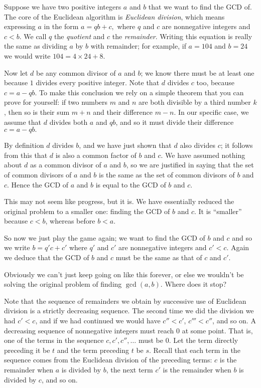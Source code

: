 \documentclass[a4paper,twocolumn]{article}
\begin{document}
Suppose we have two positive integers $a$ and $b$ that we want to find the GCD of.
The core of the Euclidean algorithm is \emph{Euclidean division}, which means expressing $a$
in the form \(a=qb+c,\) where $q$ and $c$ are nonnegative integers and $c<b$. We call $q$
the \emph{quotient} and $c$ the \emph{remainder}. Writing
this equation is really the same as dividing $a$ by $b$ with remainder; for example, if $a=104$ and $b=24$
we would write \(104=4\times24+8.\)

Now let $d$ be any common divisor of $a$ and $b$; we know there must be at least one
because $1$ divides every positive integer. Note that $d$ divides $c$ too, because $c=a-qb$.
To make this conclusion we rely on a simple theorem that you can prove for yourself:
if two numbers $m$ and $n$ are both divisible by a third number $k$, then so is their
sum $m+n$ and their difference $m-n$. In our specific case, we assume that $d$ divides both
$a$ and $qb$, and so it must divide their difference $c=a-qb.$

By definition $d$ divides $b$, and we have just shown that $d$ also divides $c$; it follows
from this that $d$ is also a common factor of $b$ and $c$. We have assumed nothing about $d$
as a common divisor of $a$ and $b$, so we are justified in saying that the set of common
divisors of $a$ and $b$ is the same as the set of common divisors of $b$ and $c$. Hence the
GCD of $a$ and $b$ is equal to the GCD of $b$ and $c$.

This may not seem like progress, but it is. We have essentially reduced the original
problem to a smaller one: finding the GCD of $b$ and $c$. It is ``smaller'' because $c<b$,
whereas before $b<a$.

So now we just play the game again; we want to find the GCD of $b$ and $c$ and so we write
\(b=q'c+c'\)
where $q'$ and $c'$ are nonnegative integers and $c'<c$. Again we deduce that the GCD of $b$
and $c$ must be the same as that of $c$ and $c'$.

Obviously  we can't just keep going on like this forever, or else we wouldn't be solving
the original problem of finding $\gcd(a,b)$. Where does it stop?

Note that the sequence of remainders we obtain by successive use of Euclidean division is a strictly decreasing sequence.
The second time we did the division we had $c'<c$, and if we had continued we would have $c''<c'$, $c'''<c''$, and so on.
A decreasing sequence of nonnegative integers must reach $0$ at some point. That is, one of the terms in the sequence
$c,c',c'',\ldots$ must be $0$. Let the term directly preceding it be $t$ and the term preceding $t$ be $s$. Recall
that each term in the sequence comes from the Euclidean division of the preceding terms: $c$ is the remainder
when $a$ is divided by $b$, the next term $c'$ is the remainder when $b$ is divided by $c$, and so on.
\end{document}
